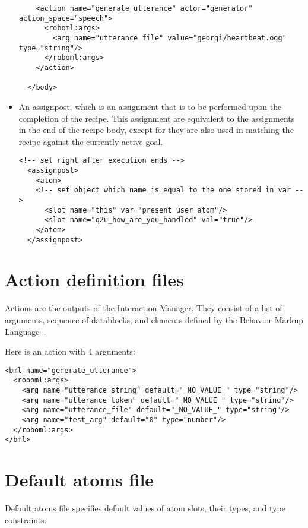 \begin{itemize}
\begin{lstlisting}
    <action name="generate_utterance" actor="generator" action_space="speech">
      <roboml:args>
        <arg name="utterance_file" value="georgi/heartbeat.ogg" type="string"/>
      </roboml:args>
    </action>
    
  </body>
\end{lstlisting}

\item An assignpost, which is an assignment that is to be performed upon the completion of the recipe. This assignment are equivalent to the assignments in the end of the recipe body, except for they are also used in matching the recipe against the currently active goal. 

\lstset{language=XML}
\begin{lstlisting}
<!-- set right after execution ends -->
  <assignpost>
    <atom>
    <!-- set object which name is equal to the one stored in var -->
      <slot name="this" var="present_user_atom"/>
      <slot name="q2u_how_are_you_handled" val="true"/>
    </atom>
  </assignpost>
\end{lstlisting}


\end{itemize}

\section{Action definition files}

Actions are the outputs of the Interaction Manager. They consist of a list of arguments, sequence of datablocks, and elements defined by the Behavior Markup Language~\citep{BMLweb}.


Here is an action with 4 arguments:

\lstset{language=XML}
\begin{lstlisting}
<bml name="generate_utterance">
  <roboml:args>
    <arg name="utterance_string" default="_NO_VALUE_" type="string"/>
    <arg name="utterance_token" default="_NO_VALUE_" type="string"/>
    <arg name="utterance_file" default="_NO_VALUE_" type="string"/>
    <arg name="test_arg" default="0" type="number"/>
  </roboml:args>
</bml>
\end{lstlisting}

\section{Default atoms file}


Default atoms file specifies default values of atom slots, their types, and type constraints. 

